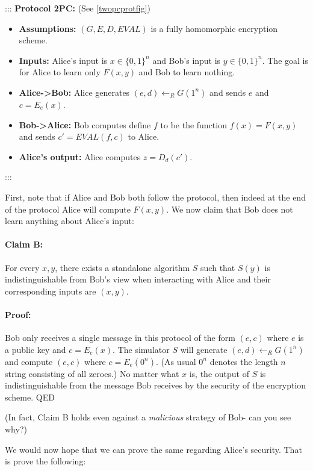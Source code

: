 ::: \textbf{Protocol 2PC:} (See \cref{twopcprotfig})

\begin{itemize}
\item
  \textbf{Assumptions:} \((G,E,D,\ensuremath{\mathit{EVAL}})\) is a
  fully homomorphic encryption scheme.
\item
  \textbf{Inputs:} Alice's input is \(x\in\{0,1\}^n\) and Bob's input is
  \(y\in\{0,1\}^n\). The goal is for Alice to learn only \(F(x,y)\) and
  Bob to learn nothing.
\item
  \textbf{Alice-\textgreater Bob:} Alice generates
  \((e,d)\leftarrow_R G(1^n)\) and sends \(e\) and \(c=E_e(x)\).
\item
  \textbf{Bob-\textgreater Alice:} Bob computes define \(f\) to be the
  function \(f(x)=F(x,y)\) and sends
  \(c'=\ensuremath{\mathit{EVAL}}(f,c)\) to Alice.
\item
  \textbf{Alice's output:} Alice computes \(z=D_d(c')\).
\end{itemize}

:::

First, note that if Alice and Bob both follow the protocol, then indeed
at the end of the protocol Alice will compute \(F(x,y)\). We now claim
that Bob does not learn anything about Alice's input:

\paragraph{Claim B:} For every \(x,y\), there exists a standalone
algorithm \(S\) such that \(S(y)\) is indistinguishable from Bob's view
when interacting with Alice and their corresponding inputs are
\((x,y)\).

\paragraph{Proof:} Bob only receives a single message in this protocol
of the form \((e,c)\) where \(e\) is a public key and \(c=E_e(x)\). The
simulator \(S\) will generate \((e,d) \leftarrow_R G(1^n)\) and compute
\((e,c)\) where \(c=E_e(0^n)\). (As usual \(0^n\) denotes the length
\(n\) string consisting of all zeroes.) No matter what \(x\) is, the
output of \(S\) is indistinguishable from the message Bob receives by
the security of the encryption scheme. QED

(In fact, Claim B holds even against a \emph{malicious} strategy of Bob-
can you see why?)

We would now hope that we can prove the same regarding Alice's security.
That is prove the following:

